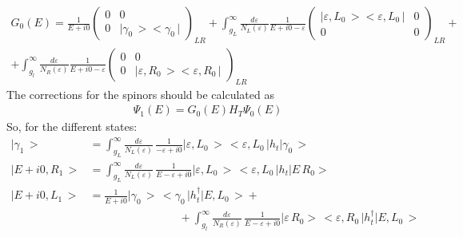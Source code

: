 \begin{multline}
	G_{0}\left(E\right)=\frac{1}{E+i0}\begin{pmatrix}0 & 0\\
	0 & \big|\gamma_{0}\,\big>\big<\gamma_{0}\,\big|
	\end{pmatrix}_{LR}+\int_{g_{L}}^{\infty}\frac{d\varepsilon}{N_{L}\left(\varepsilon\right)}\frac{1}{E+i0-\varepsilon}\begin{pmatrix}\big|\varepsilon,L_{0}\,\big>\big<\varepsilon,L_{0}\,\big| & 0\\
	0 & 0
	\end{pmatrix}_{LR}+\\+\int_{g_{l}}^{\infty}\frac{d\varepsilon}{N_{R}\left(\varepsilon\right)}\frac{1}{E+i0-\varepsilon}\begin{pmatrix}0 & 0\\
	0 & \big|\varepsilon,R_{0}\,\big>\big<\varepsilon,R_{0}\,\big|
	\end{pmatrix}_{LR}
\end{multline}
The corrections for the spinors should be calculated as
\begin{gather}
	\Psi_{1}\left(E\right)=G_{0}\left(E\right)H_{T}\Psi_{0}\left(E\right)
\end{gather}
So, for the different states:
\begin{align}
	\big|\gamma_{1}\,\big>&=\int_{g_{L}}^{\infty}\frac{d\varepsilon}{N_{L}\left(\varepsilon\right)}\,\frac{1}{-\varepsilon+i0}\big|\varepsilon,L_{0}\,\big>\,\big<\varepsilon,L_{0}\,\big|h_{t}\big|\gamma_{0}\,\big>\\\big|E+i0,R_{1}\,\big>&=\int_{g_{L}}^{\infty}\frac{d\varepsilon}{N_{L}\left(\varepsilon\right)}\,\frac{1}{E-\varepsilon+i0}\big|\varepsilon,L_{0}\,\big>\,\big<\varepsilon,L_{0}\,\big|h_{t}\big|E\,R_{0}\big>
	\\
	\nonumber
	\big|E+i0,L_{1}\,\big>&=\frac{1}{E+i0}\big|\gamma_{0}\,\big>\,\big<\gamma_{0}\,\big|h_{t}^{\dagger}\big|E,L_{0}\,\big>+
	\\	
	&\qquad\qquad\qquad\qquad
	+\int_{g_{l}}^{\infty}\frac{d\varepsilon}{N_{R}\left(\varepsilon\right)}\,\frac{1}{E-\varepsilon+i0}\big|\varepsilon\,R_{0}\big>\,\big<\varepsilon,R_{0}\,\big|h_{t}^{\dagger}\big|E,L_{0}\,\big>
\end{align}

